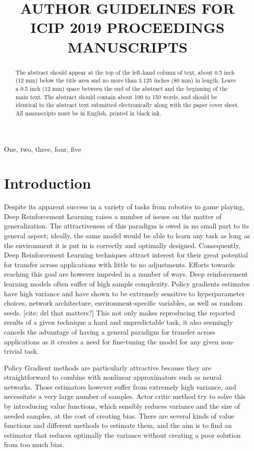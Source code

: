 \documentclass{article}
\title{AUTHOR GUIDELINES FOR ICIP 2019 PROCEEDINGS MANUSCRIPTS}
\begin{document}
%
\maketitle
%
\begin{abstract}
The abstract should appear at the top of the left-hand column of text, about
0.5 inch (12 mm) below the title area and no more than 3.125 inches (80 mm) in
length.  Leave a 0.5 inch (12 mm) space between the end of the abstract and the
beginning of the main text.  The abstract should contain about 100 to 150
words, and should be identical to the abstract text submitted electronically
along with the paper cover sheet.  All manuscripts must be in English, printed
in black ink.
\end{abstract}
%
\begin{keywords}
One, two, three, four, five
\end{keywords}
%
\section{Introduction}
\label{sec:intro}

Despite its apparent success in a variety of tasks from robotics to game playing, Deep Reinforcement Learning raises a number of issues on the matter of generalization. The attractiveness of this paradigm is owed in no small part to its general aspect; ideally, the same model would be able to learn any task as long as the environment it is put in is correctly and optimally designed. Consequently, Deep Reinforcement Learning techniques attract interest for their great potential for transfer across applications with little to no adjustments. Efforts towards reaching this goal are however impeded in a number of ways. 
Deep reinforcement learning models often suffer of high sample complexity. Policy gradients estimates have high variance and have shown  to be extremely sensitive to hyperparameter choices, network architecture, environment-specific variables, as well as random seeds. [cite: drl that matters?] %
 This not only makes reproducing the reported results of a given technique a hard and unpredictable task, it also seemingly cancels the advantage of having a general paradigm for transfer across applications as it creates a need for fine-tuning the model for any given non-trivial task.

Policy Gradient methods are particularly attractive because they are straightforward to combine with nonlinear approximators such as neural networks. Those estimators however suffer from extremely high variance, and necessitate a very large number of samples. Actor critic method try to solve this by introducing value functions, which sensibly reduces variance and the size of needed samples, at the cost of creating bias. There are several kinds of value functions and different methods to estimate them, and the aim is to find an estimator that reduces optimally the variance without creating a poor solution from too much bias.
\end{document}

